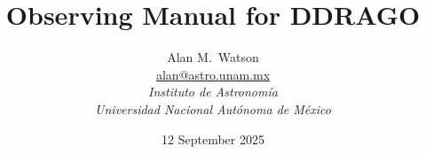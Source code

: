 \title{
\bfseries Observing Manual for DDRAGO
}

\author{
Alan M.\ Watson\\
\href{mailto:alan@astro.unam.mx}{alan@astro.unam.mx}\\[\medskipamount]
\itshape Instituto de Astronomía\\
\itshape Universidad Nacional Autónoma de México
}

\date{12 September 2025}

\maketitle

\tableofcontents